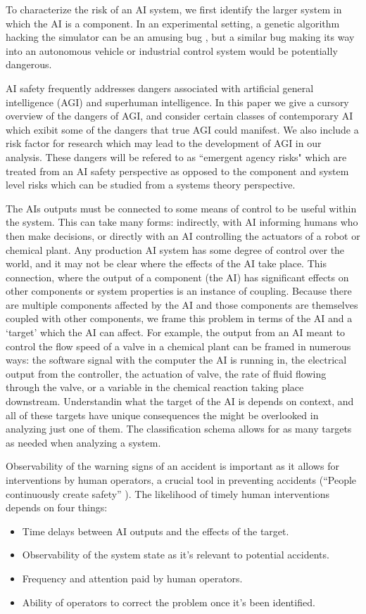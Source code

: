 \documentclass[11pt]{article}
\begin{document}
To characterize the risk of an AI system, we first identify the
larger system in which the AI is a component. In an experimental setting, a genetic algorithm
hacking the simulator can be an amusing bug \cite{lehman2018surprising}, but a similar bug making
its way into an autonomous vehicle or industrial control system would be potentially
dangerous.

AI safety frequently addresses dangers associated with artificial general intelligence (AGI) and
superhuman intelligence. In this paper we give a cursory overview of the dangers of AGI, and
consider certain classes of contemporary AI which exibit some of the dangers that true AGI could
manifest. We also include a risk factor for research which may lead to the development of AGI in our
analysis. These dangers will be refered to as ``emergent agency risks" which are treated from an AI
safety perspective as opposed to the component and system level risks which can be studied from a
systems theory perspective.

The AIs outputs must be connected to some means of control to be useful within the system. This can
take many forms: indirectly, with AI informing humans who then make decisions, or directly with an
AI controlling the actuators of a robot or chemical plant. Any production AI system has some degree
of control over the world, and it may not be clear where the effects of the AI take place. This
connection, where the output of a component (the AI) has significant effects on other components or
system properties is an instance of coupling. Because there are multiple components affected by the
AI and those components are themselves coupled with other components, we frame this problem in terms
of the AI and a `target' which the AI can affect.  For example, the output from an AI meant to
control the flow speed of a valve in a chemical plant can be framed in numerous ways: the software
signal with the computer the AI is running in, the electrical output from the controller, the
actuation of valve, the rate of fluid flowing through the valve, or a variable in the chemical
reaction taking place downstream. Understandin what the target of the AI is depends on context, and
all of these targets have unique consequences the might be overlooked in analyzing just one of them.
The classification schema allows for as many targets as needed when analyzing a system.

Observability of the warning signs of an accident is important as it allows for interventions by
human operators, a crucial tool in preventing accidents (``People continuously create safety''
\cite{cook1998complex}). The likelihood of timely human interventions depends on four things:
\begin{itemize}
    \item Time delays between AI outputs and the effects of the target.
    \item Observability of the system state as it's relevant to potential accidents.
    \item Frequency and attention paid by human operators.
    \item Ability of operators to correct the problem once it's been identified.
\end{itemize}
\end{document}
